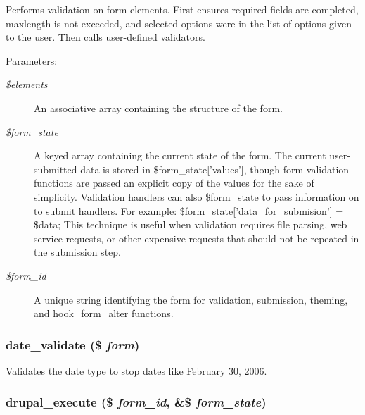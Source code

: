 Performs validation on form elements. First ensures required fields are completed, maxlength is not exceeded, and selected options were in the list of options given to the user. Then calls user-defined validators.

\begin{Desc}
\item[Parameters:]
\begin{description}
\item[{\em \$elements}]An associative array containing the structure of the form. \item[{\em \$form\_\-state}]A keyed array containing the current state of the form. The current user-submitted data is stored in \$form\_\-state\mbox{[}'values'\mbox{]}, though form validation functions are passed an explicit copy of the values for the sake of simplicity. Validation handlers can also \$form\_\-state to pass information on to submit handlers. For example: \$form\_\-state\mbox{[}'data\_\-for\_\-submision'\mbox{]} = \$data; This technique is useful when validation requires file parsing, web service requests, or other expensive requests that should not be repeated in the submission step. \item[{\em \$form\_\-id}]A unique string identifying the form for validation, submission, theming, and hook\_\-form\_\-alter functions. \end{description}
\end{Desc}
\hypertarget{group__form__api_g2030fcf127a9d122a03f4844a97e8edb}{
\subsubsection[{date\_\-validate}]{\setlength{\rightskip}{0pt plus 5cm}date\_\-validate (\$ {\em form})}}
\label{group__form__api_g2030fcf127a9d122a03f4844a97e8edb}


Validates the date type to stop dates like February 30, 2006. \hypertarget{group__form__api_g06dfc84042a094ae6b40bc1840ccced8}{
\subsubsection[{drupal\_\-execute}]{\setlength{\rightskip}{0pt plus 5cm}drupal\_\-execute (\$ {\em form\_\-id}, \/  \&\$ {\em form\_\-state})}}
\label{group__form__api_g06dfc84042a094ae6b40bc1840ccced8}


